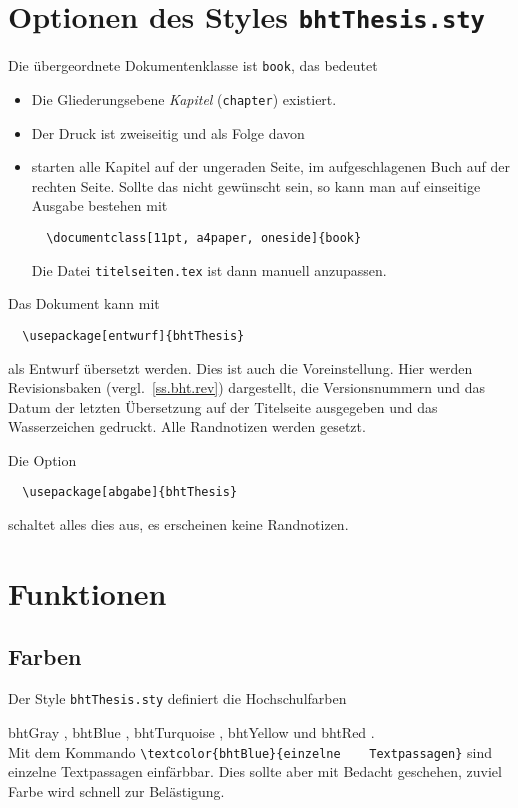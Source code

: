 \section{Optionen des Styles \texttt{bhtThesis.sty}}
Die übergeordnete Dokumentenklasse ist \texttt{book}, das bedeutet
\begin{itemize}
\item Die Gliederungsebene \emph{Kapitel} (\texttt{chapter}) existiert.
\item Der Druck ist zweiseitig und als Folge davon
\item starten alle Kapitel auf der ungeraden Seite, im aufgeschlagenen Buch auf der
  rechten Seite. Sollte das nicht gewünscht sein, so kann  man auf einseitige
  Ausgabe bestehen mit
\begin{lstlisting}
  \documentclass[11pt, a4paper, oneside]{book}
\end{lstlisting}
  Die Datei \texttt{titelseiten.tex} ist dann manuell anzupassen.
\end{itemize}

Das Dokument kann mit
\begin{lstlisting}
  \usepackage[entwurf]{bhtThesis}
\end{lstlisting}
als Entwurf übersetzt werden. Dies ist auch die Voreinstellung. Hier werden
Revisionsbaken (vergl.~\ref{ss.bht.rev}) dargestellt, die Versionsnummern und das
Datum der letzten Übersetzung auf der Titelseite ausgegeben und das Wasserzeichen
gedruckt. Alle Randnotizen werden gesetzt.

Die Option
\begin{lstlisting}
  \usepackage[abgabe]{bhtThesis}
\end{lstlisting} 
schaltet alles dies aus, es erscheinen keine Randnotizen.

\section{Funktionen}

\subsection{Farben}
Der     Style     \texttt{bhtThesis.sty}      definiert     die     Hochschulfarben

\textcolor{bhtGray}{bhtGray \Large{}},
\textcolor{bhtBlue}{bhtBlue                                    \Large{}},
\textcolor{bhtTurquoise}{bhtTurquoise                            \Large{}},
\textcolor{bhtYellow}{bhtYellow  \Large{}} und  \textcolor{bhtRed}{bhtRed
  \Large{}}.\\
Mit   dem    Kommando   \verb|\textcolor{bhtBlue}{einzelne    Textpassagen}|   sind
\textcolor{bhtBlue}{einzelne  Textpassagen}  einfärbbar.    Dies  sollte  aber  mit
Bedacht geschehen, zuviel Farbe wird schnell zur Belästigung.

